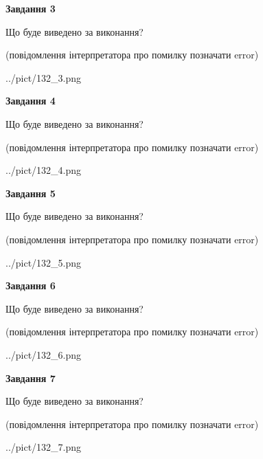 \documentclass[12pt, ukrainian]{article}
\begin{document}
{\begin {large}
{\begin {center}\textbf{Завдання 3}\end {center}}\par
Що буде виведено за виконання?\par
 (повідомлення інтерпретатора про помилку позначати error)\par
\begin{center}
	{../pict/132_3.png}
\end{center}
\newpage

{\begin {center}\textbf{Завдання 4}\end {center}}\par
Що буде виведено за виконання?\par
 (повідомлення інтерпретатора про помилку позначати error)\par
\begin{center}
	{../pict/132_4.png}
\end{center}
\newpage

{\begin {center}\textbf{Завдання 5}\end {center}}\par
Що буде виведено за виконання?\par
 (повідомлення інтерпретатора про помилку позначати error)\par
\begin{center}
	{../pict/132_5.png}
\end{center}
\newpage

{\begin {center}\textbf{Завдання 6}\end {center}}\par
Що буде виведено за виконання?\par
 (повідомлення інтерпретатора про помилку позначати error)\par
\begin{center}
	{../pict/132_6.png}
\end{center}
\newpage

{\begin {center}\textbf{Завдання 7}\end {center}}\par
Що буде виведено за виконання?\par
 (повідомлення інтерпретатора про помилку позначати error)\par
\begin{center}
	{../pict/132_7.png}
\end{center}
\newpage


\end{large}}
\end{document}
